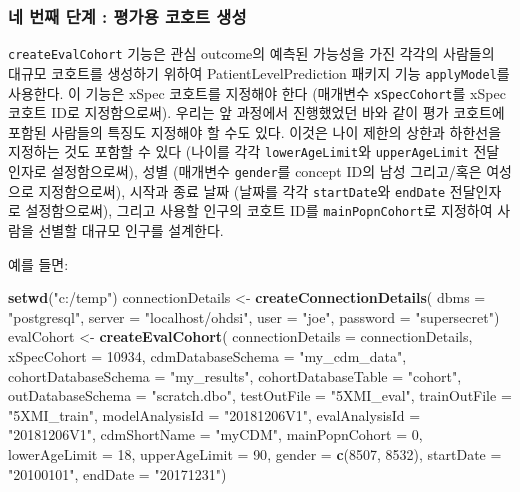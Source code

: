 \documentclass[10.5pt]{book}
\newenvironment{Shaded}{\begin{snugshade}}{\end{snugshade}}
\newcommand{\KeywordTok}[1]{\textcolor[rgb]{0.13,0.29,0.53}{\textbf{#1}}}
\newcommand{\DataTypeTok}[1]{\textcolor[rgb]{0.13,0.29,0.53}{#1}}
\newcommand{\DecValTok}[1]{\textcolor[rgb]{0.00,0.00,0.81}{#1}}
\newcommand{\StringTok}[1]{\textcolor[rgb]{0.31,0.60,0.02}{#1}}
\newcommand{\NormalTok}[1]{#1}
\theoremstyle{definition}
\theoremstyle{definition}
\theoremstyle{definition}
\theoremstyle{remark}
\begin{document}
\subsubsection*{네 번째 단계 : 평가용 코호트 생성}\label{-----}

\texttt{createEvalCohort} 기능은 관심 outcome의 예측된 가능성을 가진
각각의 사람들의 대규모 코호트를 생성하기 위하여 PatientLevelPrediction
패키지 기능 \texttt{applyModel}를 사용한다. 이 기능은 xSpec 코호트를
지정해야 한다 (매개변수 \texttt{xSpecCohort}를 xSpec 코호트 ID로
지정함으로써). 우리는 앞 과정에서 진행했었던 바와 같이 평가 코호트에
포함된 사람들의 특징도 지정해야 할 수도 있다. 이것은 나이 제한의 상한과
하한선을 지정하는 것도 포함할 수 있다 (나이를 각각
\texttt{lowerAgeLimit}와 \texttt{upperAgeLimit} 전달 인자로
설정함으로써), 성별 (매개변수 \texttt{gender}를 concept ID의 남성
그리고/혹은 여성으로 지정함으로써), 시작과 종료 날짜 (날짜를 각각
\texttt{startDate}와 \texttt{endDate} 전달인자로 설정함으로써), 그리고
사용할 인구의 코호트 ID를 \texttt{mainPopnCohort}로 지정하여 사람을
선별할 대규모 인구를 설계한다.

예를 들면:

\begin{Shaded}
\begin{Highlighting}[]
\KeywordTok{setwd}\NormalTok{(}\StringTok{"c:/temp"}\NormalTok{)}
\NormalTok{connectionDetails <-}\StringTok{ }\KeywordTok{createConnectionDetails}\NormalTok{(}
  \DataTypeTok{dbms =} \StringTok{"postgresql"}\NormalTok{,}
  \DataTypeTok{server =} \StringTok{"localhost/ohdsi"}\NormalTok{,}
  \DataTypeTok{user =} \StringTok{"joe"}\NormalTok{,}
  \DataTypeTok{password =} \StringTok{"supersecret"}\NormalTok{)}
\NormalTok{evalCohort <-}\StringTok{ }\KeywordTok{createEvalCohort}\NormalTok{(}
  \DataTypeTok{connectionDetails =}\NormalTok{ connectionDetails,}
  \DataTypeTok{xSpecCohort =} \DecValTok{10934}\NormalTok{,}
  \DataTypeTok{cdmDatabaseSchema =} \StringTok{"my_cdm_data"}\NormalTok{,}
  \DataTypeTok{cohortDatabaseSchema =} \StringTok{"my_results"}\NormalTok{,}
  \DataTypeTok{cohortDatabaseTable =} \StringTok{"cohort"}\NormalTok{,}
  \DataTypeTok{outDatabaseSchema =} \StringTok{"scratch.dbo"}\NormalTok{,}
  \DataTypeTok{testOutFile =} \StringTok{"5XMI_eval"}\NormalTok{,}
  \DataTypeTok{trainOutFile =} \StringTok{"5XMI_train"}\NormalTok{,}
  \DataTypeTok{modelAnalysisId =} \StringTok{"20181206V1"}\NormalTok{,}
  \DataTypeTok{evalAnalysisId =} \StringTok{"20181206V1"}\NormalTok{,}
  \DataTypeTok{cdmShortName =} \StringTok{"myCDM"}\NormalTok{,}
  \DataTypeTok{mainPopnCohort =} \DecValTok{0}\NormalTok{,}
  \DataTypeTok{lowerAgeLimit =} \DecValTok{18}\NormalTok{,}
  \DataTypeTok{upperAgeLimit =} \DecValTok{90}\NormalTok{,}
  \DataTypeTok{gender =} \KeywordTok{c}\NormalTok{(}\DecValTok{8507}\NormalTok{, }\DecValTok{8532}\NormalTok{),}
  \DataTypeTok{startDate =} \StringTok{"20100101"}\NormalTok{,}
  \DataTypeTok{endDate =} \StringTok{"20171231"}\NormalTok{)}
\end{Highlighting}
\end{Shaded}
\end{document}
